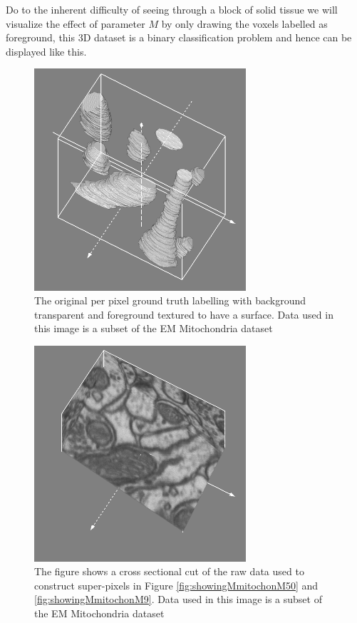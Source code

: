Do to the inherent difficulty of seeing through a block of solid tissue we will visualize the effect of parameter $M$ by only drawing the voxels labelled as foreground, this 3D dataset is a binary classification problem and hence can be displayed like this. 

\begin{figure}[H]
  \centering
  \includegraphics[width=0.7\textwidth]{images/mitochon_groundTruth.png}
  \caption{ The original per pixel ground truth labelling with background transparent and foreground textured to have a surface. Data used in this image is a subset of the EM Mitochondria dataset \cite{mitochondriaData}} 
  \label{fig:showingMmitochonGT}
\end{figure} 
\begin{figure}[H]
  \centering
  \includegraphics[width=0.7\textwidth]{images/mitochon_original_features.png}
  \caption{ The figure shows a cross sectional cut of the raw data used to construct super-pixels in Figure \ref{fig:showingMmitochonM50} and \ref{fig:showingMmitochonM9}. Data used in this image is a subset of the EM Mitochondria dataset \cite{mitochondriaData}} 
  \label{fig:showingMmitochonRaw}
\end{figure} 

